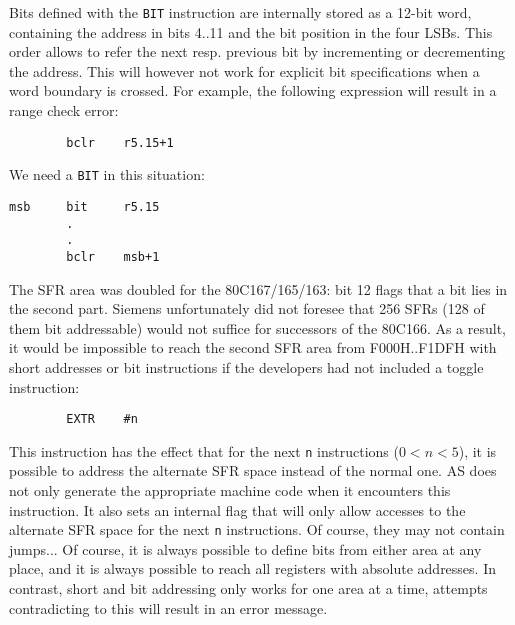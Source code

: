 \documentclass[12pt,twoside]{report}
\newcommand{\tty}[1]{{\tt #1}}
\begin{document}
Bits defined with the \tty{BIT} instruction are internally stored as a
12-bit word, containing the address in bits 4..11 and the bit
position in the four LSBs.  This order allows to refer the next resp.
previous bit by incrementing or decrementing the address.  This will
however not work for explicit bit specifications when a word boundary
is crossed.  For example, the following expression will result in a
range check error:
\begin{verbatim}
        bclr    r5.15+1
\end{verbatim}
We need a \tty{BIT} in this situation:
\begin{verbatim}
msb     bit     r5.15
        .
        .
        bclr    msb+1
\end{verbatim}
The SFR area was doubled for the 80C167/165/163: bit 12 flags that a bit
lies in the second part.  Siemens unfortunately did not foresee that
256 SFRs (128 of them bit addressable) would not suffice for
successors of the 80C166.  As a result, it would be impossible to
reach the second SFR area from F000H..F1DFH with short addresses or
bit instructions if the developers had not included a toggle
instruction:
\begin{verbatim}
        EXTR    #n
\end{verbatim}
This instruction has the effect that for the next \tty{n} instructions
($0<n<5$), it is possible to address the alternate SFR space instead of
the normal one.  AS does not only generate the appropriate machine
code when it encounters this instruction.  It also sets an internal
flag that will only allow accesses to the alternate SFR space for
the next \tty{n} instructions.  Of course, they may not contain jumps...
Of course, it is always possible to define bits from either area at
any place, and it is always possible to reach all registers with
absolute addresses.  In contrast, short and bit addressing only works
for one area at a time, attempts contradicting to this will result in
an error message.
\end{document}
